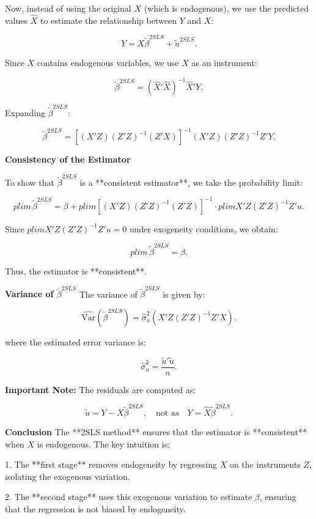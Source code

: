 \documentclass[12pt, oneside]{article}
\begin{document}
Now, instead of using the original \( X \) (which is endogenous), we use the predicted values \( \hat{X} \) to estimate the relationship between \( Y \) and \( X \):

\[
Y = X \tilde{\beta}^{2SLS} + \tilde{u}^{2SLS}.
\]

Since \( X \) contains endogenous variables, we use \( \hat{X} \) as an instrument:

\[
\tilde{\beta}^{2SLS} = (\hat{X}'\hat{X})^{-1} \hat{X}' Y.
\]

Expanding \( \tilde{\beta}^{2SLS} \):

\[
\tilde{\beta}^{2SLS} = [(X'Z)(Z'Z)^{-1} (Z'X)]^{-1} (X'Z)(Z'Z)^{-1} Z'Y.
\]

\textbf{Consistency of the Estimator}

To show that \( \tilde{\beta}^{2SLS} \) is a **consistent estimator**, we take the probability limit:

\[
plim \, \tilde{\beta}^{2SLS} = \beta + plim \left[(X'Z)(Z'Z)^{-1} (Z'Z)\right]^{-1} \cdot plim X'Z(Z'Z)^{-1}Z'u.
\]

Since \( plim X'Z(Z'Z)^{-1}Z'u = 0 \) under exogeneity conditions, we obtain:

\[
plim \, \tilde{\beta}^{2SLS} = \beta.
\]

Thus, the estimator is **consistent**.

\textbf*{Variance of \( \tilde{\beta}^{2SLS} \)}
The variance of \( \tilde{\beta}^{2SLS} \) is given by:

\[
\widehat{\text{Var}} (\tilde{\beta}^{2SLS}) = \hat{\sigma}_u^2 (X'Z(Z'Z)^{-1}Z'X).
\]

where the estimated error variance is:

\[
\hat{\sigma}_u^2 = \frac{\tilde{u}'\tilde{u}}{n}.
\]

\textbf{Important Note:} The residuals are computed as:

\[
\tilde{u} = Y - X \tilde{\beta}^{2SLS}, \quad \text{not as} \quad Y = \hat{X} \tilde{\beta}^{2SLS}.
\]

\textbf{Conclusion}
The **2SLS method** ensures that the estimator is **consistent** when \( X \) is endogenous. The key intuition is:

1. The **first stage** removes endogeneity by regressing \( X \) on the instruments \( Z \), isolating the exogenous variation.

2. The **second stage** uses this exogenous variation to estimate \( \beta \), ensuring that the regression is not biased by endogeneity.
\end{document}
